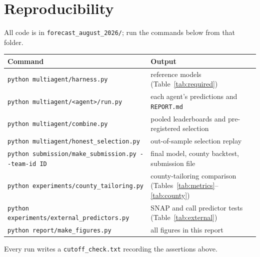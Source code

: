 \documentclass[11pt,letterpaper]{article}
\begin{document}
\section{Reproducibility}
All code is in \texttt{forecast\_august\_2026/}; run the commands below from that folder.
\begin{center}\small
\begin{tabularx}{\textwidth}{lX}
\toprule
Command & Output\\
\midrule
\texttt{python multiagent/harness.py} & reference models (Table~\ref{tab:required})\\
\texttt{python multiagent/<agent>/run.py} & each agent's predictions and \texttt{REPORT.md}\\
\texttt{python multiagent/combine.py} & pooled leaderboards and pre-registered selection\\
\texttt{python multiagent/honest\_selection.py} & out-of-sample selection replay\\
\texttt{python submission/make\_submission.py -{}-team-id ID} & final model, county backtest, submission file\\
\texttt{python experiments/county\_tailoring.py} & county-tailoring comparison (Tables~\ref{tab:metrics}--\ref{tab:county})\\
\texttt{python experiments/external\_predictors.py} & SNAP and call predictor tests (Table~\ref{tab:external})\\
\texttt{python report/make\_figures.py} & all figures in this report\\
\bottomrule
\end{tabularx}
\end{center}
Every run writes a \texttt{cutoff\_check.txt} recording the assertions above.
\end{document}
